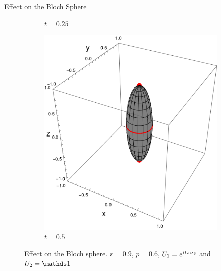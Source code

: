 \begin{frame}{Effect on the Bloch Sphere}
\begin{figure}[h!]
\begin{subfigure}{0.32\textwidth}
            \caption{$t=0.25$}
        \end{subfigure}
        \begin{subfigure}{0.32\textwidth}
            \centering
            \includegraphics[width=0.9\linewidth]{figures/U1xU2_H1=Pi(sz)_H2=Id_z=0.9_p=0.6t=0.5.png}
            \caption{$t=0.5$}
        \end{subfigure}
        \caption{Effect on the Bloch sphere. $r=0.9$, $p=0.6$, $U_{1}=e^{it\pi \sigma_{3}}$ and $U_{2}=\Id$}
    \end{figure}
\end{frame}



